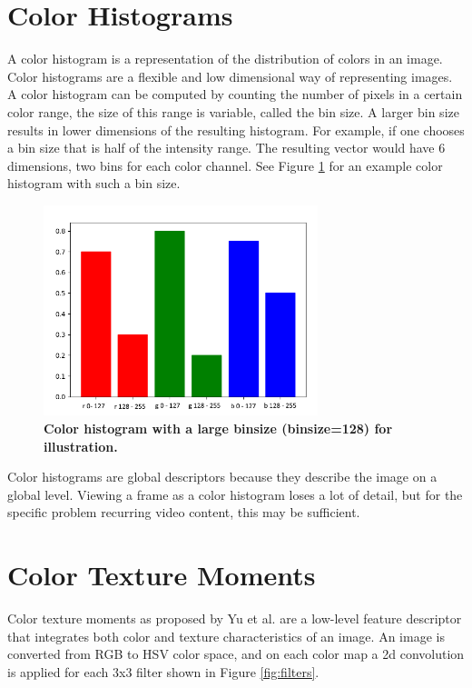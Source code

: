 \documentclass{report}
\begin{document}
\section{Color Histograms}
A color histogram is a representation of the distribution of colors in an image. Color histograms are a flexible and low dimensional way of representing images. A color histogram can be computed by counting the number of pixels in a certain color range, the size of this range is variable, called the bin size. A larger bin size results in lower dimensions of the resulting histogram. For example, if one chooses a bin size that is half of the intensity range. The resulting vector would have 6 dimensions, two bins for each color channel. See Figure \ref{fig:colorhistogram} for an example color histogram with such a bin size.
\begin{figure}[H]
	\includegraphics[width=8cm]{images/colorhistogram.png}
	\centering
	\caption{\textbf{Color histogram with a large binsize (binsize=128) for illustration.}}
	\label{fig:colorhistogram}
\end{figure}
Color histograms are global descriptors because they describe the image on a global level. Viewing a frame as a color histogram loses a lot of detail, but for the specific problem recurring video content, this may be sufficient.

\section{Color Texture Moments}
Color texture moments as proposed by Yu et al. \cite{yu2002colortexturemoments} are a low-level feature descriptor that integrates both color and texture characteristics of an image. An image is converted from RGB to HSV color space, and on each color map a 2d convolution is applied for each 3x3 filter shown in Figure \ref{fig:filters}.
\end{document}
